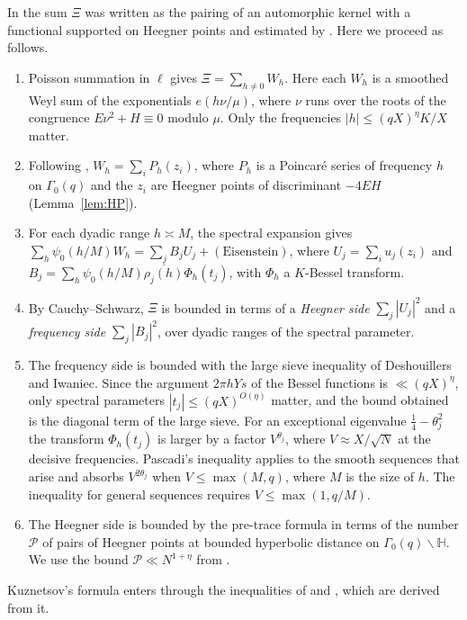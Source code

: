 \documentclass[11pt]{amsart}
\theoremstyle{remark}
\theoremstyle{definition}
\numberwithin{equation}{section}
\newcommand{\Pc}{\mathcal{P}}
\newcommand{\Hb}{\mathbb{H}}
\begin{document}
In \cite{II} the sum $\Xi$ was written as the pairing of an automorphic kernel with a functional supported on Heegner points and estimated by \cite[Theorem~8.1]{GM1}. Here we proceed as follows.
\begin{enumerate}
\item Poisson summation in $\ell$ gives $\Xi=\sum_{h\ne0}W_h$. Here each $W_h$ is a smoothed Weyl sum of the exponentials $e(h\nu/\mu)$, where $\nu$ runs over the roots of the congruence $E\nu^2+H\equiv0$ modulo $\mu$. Only the frequencies $|h|\le(qX)^\eta K/X$ matter.
\item Following \cite{DFI95}, $W_h=\sum_iP_h(z_i)$, where $P_h$ is a Poincar\'e series of frequency $h$ on $\Gamma_0(q)$ and the $z_i$ are Heegner points of discriminant $-4EH$ (Lemma~\ref{lem:HP}).
\item For each dyadic range $h\asymp M$, the spectral expansion gives $\sum_h\psi_0(h/M)W_h=\sum_jB_jU_j+(\text{Eisenstein})$, where $U_j=\sum_iu_j(z_i)$ and $B_j=\sum_h\psi_0(h/M)\overline{\rho_j(h)}\Phi_h(t_j)$, with $\Phi_h$ a $K$-Bessel transform.
\item By Cauchy--Schwarz, $\Xi$ is bounded in terms of a \emph{Heegner side} $\sum_j|U_j|^2$ and a \emph{frequency side} $\sum_j|B_j|^2$, over dyadic ranges of the spectral parameter.
\item The frequency side is bounded with the large sieve inequality of Deshouillers and Iwaniec. Since the argument $2\pi hYs$ of the Bessel functions is $\ll(qX)^\eta$, only spectral parameters $|t_j|\le(qX)^{O(\eta)}$ matter, and the bound obtained is the diagonal term of the large sieve. For an exceptional eigenvalue $\frac14-\theta_j^2$ the transform $\Phi_h(t_j)$ is larger by a factor $V^{\theta_j}$, where $V\approx X/\sqrt N$ at the decisive frequencies. Pascadi's inequality \cite[Theorem~2]{Pas} applies to the smooth sequences that arise and absorbs $V^{2\theta_j}$ when $V\le\max(M,q)$, where $M$ is the size of $h$. The inequality \cite[Theorem~5]{DI} for general sequences requires $V\le\max(1,q/M)$.
\item The Heegner side is bounded by the pre-trace formula in terms of the number $\Pc$ of pairs of Heegner points at bounded hyperbolic distance on $\Gamma_0(q)\backslash\Hb$. We use the bound $\Pc\ll N^{1+\eta}$ from \cite[Lemma~6.4]{II}.
\end{enumerate}
Kuznetsov's formula enters through the inequalities of \cite{DI} and \cite{Pas}, which are derived from it.
\end{document}
